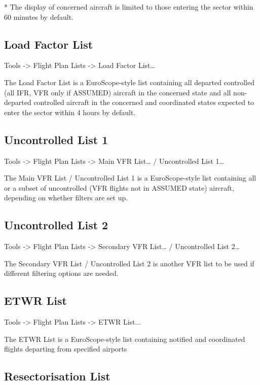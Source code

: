 \documentclass[11pt,a4paper]{memoir}
\begin{document}
* The display of concerned aircraft is limited to those entering the sector within 60 minutes by default.

\subsection{Load Factor List}
\label{list:load}

\textit{} Tools -> Flight Plan Lists -> Load Factor List…

The Load Factor List is a EuroScope-style list containing all departed controlled (all IFR, VFR only if ASSUMED) aircraft in the concerned state and all non-departed controlled aircraft in the concerned and coordinated states expected to enter the sector within 4 hours by default.

\subsection{Uncontrolled List 1}
\label{list:uncon1}

\textit{} Tools -> Flight Plan Lists -> Main VFR List… / Uncontrolled List 1…

The Main VFR List / Uncontrolled List 1 is a EuroScope-style list containing all or a subset of uncontrolled (VFR flights not in ASSUMED state) aircraft, depending on whether filters are set up.

\subsection{Uncontrolled List 2}
\label{list:uncon2}

\textit{} Tools -> Flight Plan Lists -> Secondary VFR List… / Uncontrolled List 2…

The Secondary VFR List / Uncontrolled List 2 is another VFR list to be used if different filtering options are needed.

\subsection{ETWR List}
\label{list:etwr}

\textit{} Tools -> Flight Plan Lists -> ETWR List...

The ETWR List is a EuroScope-style list containing notified and coordinated flights departing from specified airports

\subsection{Resectorisation List}
\label{list:resec}
\end{document}
